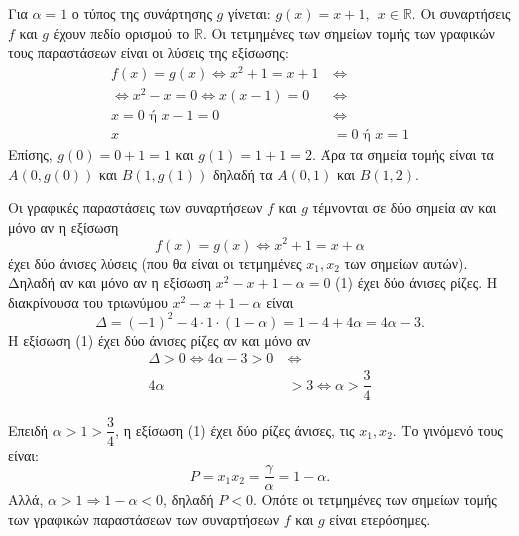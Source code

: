
\begin{alist}
\item Για $\alpha = 1$ ο τύπος της συνάρτησης $g$ γίνεται: $g(x) = x + 1, \ \ x \in \mathbb{R}$.
Οι συναρτήσεις $f$ και $g$ έχουν πεδίο ορισμού το $\mathbb{R}$. Οι τετμημένες των σημείων τομής των
γραφικών τους παραστάσεων είναι οι λύσεις της εξίσωσης:
\begin{align*}
f(x) = g(x) \Leftrightarrow x^2 + 1 = x + 1 \ &\Leftrightarrow \\
\Leftrightarrow x^2 - x = 0 \Leftrightarrow x(x - 1) = 0 \ &\Leftrightarrow \\
x = 0 \text{ ή } x - 1 = 0 \ &\Leftrightarrow \\
x &= 0 \text{ ή } x = 1
\end{align*}
Επίσης, $g(0) = 0 + 1 = 1$ και $g(1) = 1 + 1 = 2$.
Άρα τα σημεία τομής είναι τα $A(0, g(0))$ και $B(1, g(1))$ δηλαδή τα $A(0, 1)$ και $B(1, 2)$.

\item Οι γραφικές παραστάσεις των συναρτήσεων $f$ και $g$ τέμνονται σε δύο σημεία αν και
μόνο αν η εξίσωση
\[f(x) = g(x) \Leftrightarrow x^2 + 1 = x + \alpha\]
έχει δύο άνισες λύσεις (που θα είναι οι τετμημένες $x_1, x_2$ των σημείων αυτών).
Δηλαδή αν και μόνο αν η εξίσωση
$x^2 - x + 1 - \alpha = 0$ (1)
έχει δύο άνισες ρίζες.
Η διακρίνουσα του τριωνύμου $x^2 - x + 1 - \alpha$ είναι
\[\Delta = (-1)^2 - 4 \cdot 1 \cdot (1 - \alpha) = 1 - 4 + 4\alpha = 4\alpha - 3.\]
Η εξίσωση (1) έχει δύο άνισες ρίζες αν και μόνο αν
\begin{align*}
\Delta > 0 \Leftrightarrow 4\alpha - 3 > 0 \ &\Leftrightarrow \\
4\alpha &> 3 \Leftrightarrow \alpha > \dfrac{3}{4}
\end{align*}

\item Επειδή $\alpha > 1 > \dfrac{3}{4}$, η εξίσωση (1) έχει δύο ρίζες άνισες, τις $x_1, x_2$. Το γινόμενό τους είναι:
\[P = x_1 x_2 = \dfrac{\gamma}{\alpha} = 1 - \alpha.\]
Αλλά, $\alpha > 1 \Rightarrow 1 - \alpha < 0$, δηλαδή $P < 0$. Οπότε οι τετμημένες των σημείων τομής των
γραφικών παραστάσεων των συναρτήσεων $f$ και $g$ είναι ετερόσημες.
\end{alist}

